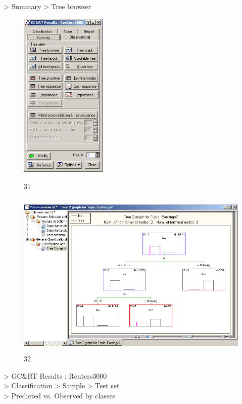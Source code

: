 \newpage

> Summary > Tree browser

\begin{figure}[!h]
  \centering

  \begin{minipage}{0.29\textwidth}
    \centering

    \includegraphics[height=8cm]
    {inc/31.PNG}

    \caption{31}

    \label{fig:31}
  \end{minipage}
  \begin{minipage}{0.69\textwidth}
    \centering

    \includegraphics[height=8cm]
    {inc/32.PNG}

    \caption{32}

    \label{fig:32}
  \end{minipage}
\end{figure}

> GC\&RT Results : Reuters3000 \\
> Classification > Sample > Test set \\
> Predicted vs. Observed by classes \\

